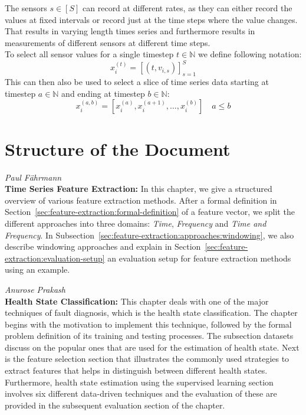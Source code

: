 The sensors $s \in [S]$ can record at different rates, as they can either record the values at fixed intervals or record just at the time steps where the value changes.
That results in varying length times series and furthermore results in measurements of different sensors at different time steps.\\
To select all sensor values for a single timestep $t\in\mathbb{N}$ we define following notation:
\begin{equation}
  x^{(t)}_i= \left[ \left( t,v_{i,s} \right) \right]_{s=1}^{S}
\end{equation}
This can then also be used to select a slice of time series data starting at timestep $a\in\mathbb{N}$ and ending at timestep $b\in\mathbb{N}$:
\begin{equation}
  x^{(a,b)}_i= \left[ x^{(a)}_i, x^{(a+1)}_i, \ldots, x^{(b)}_i \right] \quad a\leq b
\end{equation}

\section{Structure of the Document}

\label{sec:intro:structure}

\hfill{\normalsize\emph{Paul Fährmann}} \\
\textbf{Time Series Feature Extraction:} In this chapter, we give a structured overview of various feature extraction methods. After a formal definition in Section~\ref{sec:feature-extraction:formal-definition} of a feature vector, we split the different approaches into three domains: \textit{Time}, \textit{Frequency} and \textit{Time and Frequency}. In Subsection~\ref{sec:feature-extraction:approaches:windowing}, we also describe windowing approaches and explain in Section~\ref{sec:feature-extraction:evaluation-setup} an evaluation setup for feature extraction methods using an example.

\hfill{\normalsize\emph{Anurose Prakash}} \\
\textbf{Health State Classification:} This chapter deals with one of the major techniques of fault diagnosis, which is the health state classification. The chapter begins with the motivation to implement this technique, followed by the formal problem definition of its training and testing processes. The subsection datasets discuss on the popular ones that are used for the estimation of health state. Next is the feature selection section that illustrates the commonly used strategies to extract features that helps in distinguish between different health states. Furthermore, health state estimation using the supervised learning section involves six different data-driven techniques and the evaluation of these are provided in the subsequent evaluation section of the chapter.

